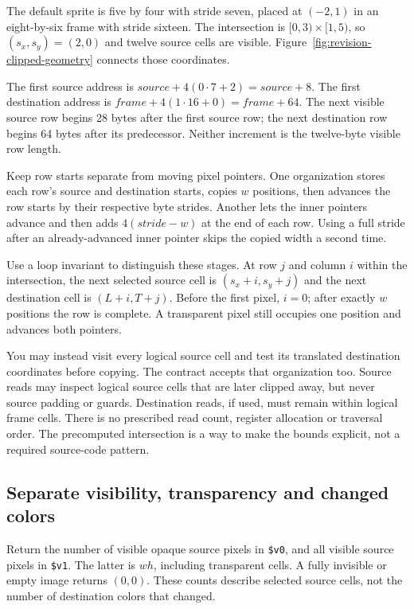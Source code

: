 The default sprite is five by four with stride seven, placed at $(-2,1)$ in an
eight-by-six frame with stride sixteen. The intersection is $[0,3)\times[1,5)$,
so $(s_x,s_y)=(2,0)$ and twelve source cells are visible.
Figure~\ref{fig:revision-clipped-geometry} connects those coordinates.



The first source address is $source+4(0\cdot7+2)=source+8$. The first destination
address is $frame+4(1\cdot16+0)=frame+64$. The next visible source row begins
28 bytes after the first source row; the next destination row begins 64 bytes
after its predecessor. Neither increment is the twelve-byte visible row length.

Keep row starts separate from moving pixel pointers. One organization stores each
row's source and destination starts, copies $w$ positions, then advances the row
starts by their respective byte strides. Another lets the inner pointers advance
and then adds $4(stride-w)$ at the end of each row. Using a full stride after an
already-advanced inner pointer skips the copied width a second time.

Use a loop invariant to distinguish these stages. At row $j$ and column $i$ within
the intersection, the next selected source cell is $(s_x+i,s_y+j)$ and the next
destination cell is $(L+i,T+j)$. Before the first pixel, $i=0$; after exactly $w$
positions the row is complete. A transparent pixel still occupies one position
and advances both pointers.

You may instead visit every logical source cell and test its translated destination
coordinates before copying. The contract accepts that organization too. Source
reads may inspect logical source cells that are later clipped away, but never
source padding or guards. Destination reads, if used, must remain within logical
frame cells. There is no prescribed read count, register allocation or traversal
order. The precomputed intersection is a way to make the bounds explicit, not a
required source-code pattern.

\subsection*{Separate visibility, transparency and changed colors}

Return the number of visible opaque source pixels in \texttt{\$v0}, and all
visible source pixels in \texttt{\$v1}. The latter is $wh$, including transparent
cells. A fully invisible or empty image returns $(0,0)$. These counts describe
selected source cells, not the number of destination colors that changed.

